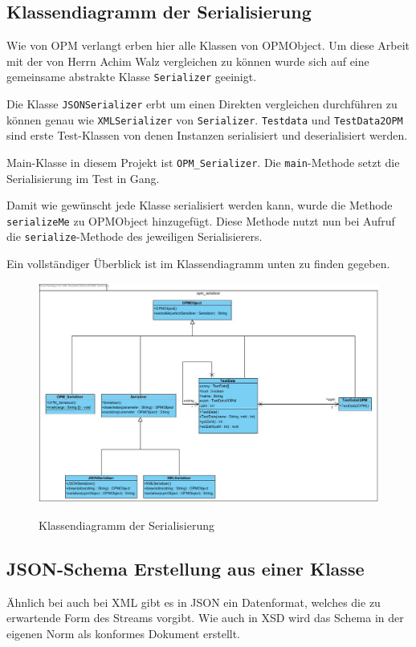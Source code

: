 
\subsection{Klassendiagramm der Serialisierung}

Wie von OPM verlangt erben hier alle Klassen von OPMObject. Um diese Arbeit mit der von Herrn Achim Walz vergleichen zu k\"onnen wurde sich auf eine gemeinsame abstrakte Klasse \texttt{Serializer} geeinigt. 

Die Klasse \texttt{JSONSerializer} erbt um einen Direkten vergleichen durchf\"uhren zu k\"onnen genau wie \texttt{XMLSerializer} von \texttt{Serializer}.
\texttt{Testdata} und \texttt{TestData2OPM} sind erste Test-Klassen von denen Instanzen serialisiert und deserialisiert werden.

Main-Klasse in diesem Projekt ist \texttt{OPM\_Serializer}. Die \texttt{main}-Methode setzt die Serialisierung im Test in Gang.

Damit wie gew\"unscht jede Klasse serialisiert werden kann, wurde die Methode \texttt{serializeMe} zu OPMObject hinzugef\"ugt.
Diese Methode nutzt nun bei Aufruf die \texttt{serialize}-Methode des jeweiligen Serialisierers.

Ein vollst\"andiger \"Uberblick ist im Klassendiagramm unten zu finden gegeben.

\FloatBarrier
\begin{figure}[ht]
\includegraphics[width=16cm]{Bilder/Erstes_EKD}
\label{Klassendiagramm der Serialisierung}
\caption{Klassendiagramm der Serialisierung} 
\end{figure}

\subsection{JSON-Schema Erstellung aus einer Klasse}\label{JSON-Schema}
\"Ahnlich bei auch bei XML gibt es in JSON ein Datenformat, welches die zu erwartende Form des Streams vorgibt.
Wie auch in XSD wird das Schema in der eigenen Norm als konformes Dokument erstellt.


